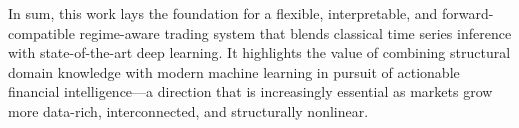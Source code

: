 In sum, this work lays the foundation for a flexible, interpretable, and forward-compatible regime-aware trading system that blends classical time series inference with state-of-the-art deep learning. It highlights the value of combining structural domain knowledge with modern machine learning in pursuit of actionable financial intelligence—a direction that is increasingly essential as markets grow more data-rich, interconnected, and structurally nonlinear.
